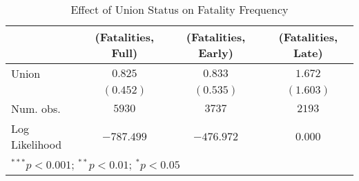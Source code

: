 
\begin{table}
\begin{center}
\begin{tabular}{l c c c}
\hline
 & (Fatalities, Full) & (Fatalities, Early) & (Fatalities, Late) \\
\hline
Union          & $0.825$    & $0.833$    & $1.672$   \\
               & $(0.452)$  & $(0.535)$  & $(1.603)$ \\
\hline
Num. obs.      & $5930$     & $3737$     & $2193$    \\
Log Likelihood & $-787.499$ & $-476.972$ & $0.000$   \\
\hline
\multicolumn{4}{l}{\scriptsize{$^{***}p<0.001$; $^{**}p<0.01$; $^{*}p<0.05$}}
\end{tabular}
\caption{Effect of Union Status on Fatality Frequency}
\label{irr_fte_fatalities_table}
\end{center}
\end{table}


